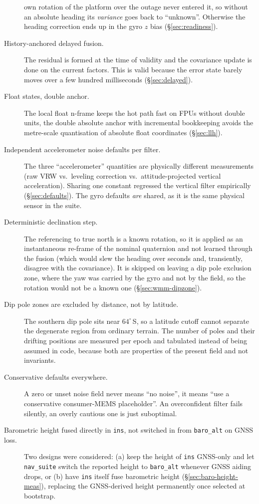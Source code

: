 \documentclass[11pt,a4paper]{article}
\newcommand{\code}[1]{\texttt{#1}}
\begin{document}
\begin{description}
    own rotation of the platform over the outage never entered it, so
    without an absolute heading its \emph{variance} goes back to
    ``unknown''. Otherwise the heading correction ends up in the gyro
    $z$ bias (\S\ref{sec:readiness}).
  \item[History-anchored delayed fusion.] The residual is formed at the time
    of validity and the covariance update is done on the current factors. This
    is valid because the error state barely moves over a few hundred
    milliseconds (\S\ref{sec:delayed}).
  \item[Float states, double anchor.] The local float n-frame keeps the hot
    path fast on FPUs without double units, the double
    absolute anchor with incremental bookkeeping avoids the metre-scale
    quantisation of absolute float coordinates (\S\ref{sec:llh}).
  \item[Independent accelerometer noise defaults per filter.] The three
    ``accelerometer'' quantities are physically different measurements
    (raw VRW vs.\ leveling correction vs.\ attitude-projected vertical
    acceleration). Sharing one constant regressed the vertical filter
    empirically (\S\ref{sec:defaults}). The gyro defaults \emph{are} shared,
    as it is the same physical sensor in the suite.
  \item[Deterministic declination step.] The referencing to true north is a
    known rotation, so it is applied as an instantaneous re-frame of
    the nominal quaternion and not learned through the fusion (which would
    slew the heading over seconds and, transiently, disagree with the
    covariance). It is skipped on leaving a dip pole exclusion zone,
    where the yaw was carried by the gyro and not by the field, so the
    rotation would not be a known one
    (\S\ref{sec:wmm-dipzone}).
  \item[Dip pole zones are excluded by distance, not by latitude.] The
    southern dip pole sits near $64^\circ$\,S, so a latitude cutoff
    cannot separate the degenerate region from ordinary terrain. The
    number of poles and their drifting positions are measured per epoch
    and tabulated instead of being assumed in code, because both are
    properties of the present field and not invariants.
  \item[Conservative defaults everywhere.] A zero or unset noise field
    never means ``no noise'', it means ``use a conservative
    consumer-MEMS placeholder''. An overconfident filter fails
    silently, an overly cautious one is just suboptimal.
  \item[Barometric height fused directly in \code{ins}, not switched in from
    \code{baro\_\allowbreak{}alt} on GNSS loss.] Two designs were considered: (a) keep
    the height of \code{ins} GNSS-only and let \code{nav\_\allowbreak{}suite} switch the
    reported height to \code{baro\_\allowbreak{}alt} whenever GNSS aiding drops, or (b) have
    \code{ins} itself fuse barometric height (\S\ref{sec:baro-height-meas}),
    replacing the GNSS-derived height permanently once selected at bootstrap.


\end{description}
\end{document}
